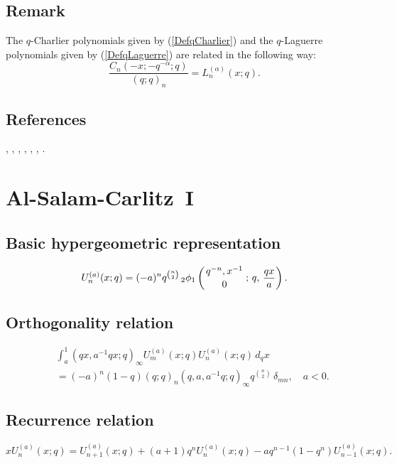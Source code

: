 \documentclass[envcountchap,graybox]{svmono}
\newcommand{\qhyp}[5]{\mbox{}_{#1}{\phi}_{#2}
\left(\genfrac{}{}{0pt}{}{#3}{#4}\,;\,q,\,#5\right)}
\newcommand{\qhyp}[5]{\,\mbox{}_{#1}\phi_{#2}\!\left(
  \genfrac{}{}{0pt}{}{#3}{#4};#5\right)}
\begin{document}
{{\subsection*{Remark}
The $q$-Charlier polynomials given by (\ref{DefqCharlier}) and the
$q$-Laguerre polynomials given by (\ref{DefqLaguerre}) are related in the
following way:
$$\frac{C_n(-x;-q^{-\alpha};q)}{(q;q)_n}=L_n^{(\alpha)}(x;q).$$

\subsection*{References}
\cite{AlvarezRonveaux}, \cite{AtakRahmanSuslov}, \cite{GasperRahman90},
\cite{Hahn}, \cite{Koelink96III}, \cite{Nikiforov+}, \cite{Zeng95}.


\section{Al-Salam-Carlitz~I}
\par\setcounter{equation}{0}

\subsection*{Basic hypergeometric representation}
\begin{equation}
\label{DefAlSalamCarlitzI}
U_n^{(a)}(x;q)=(-a)^nq^{\binom{n}{2}}\,\qhyp{2}{1}{q^{-n},x^{-1}}{0}{\frac{qx}{a}}.
\end{equation}

\subsection*{Orthogonality relation}
\begin{eqnarray}
\label{OrtAlSalamCarlitzI}
& &\int_a^1(qx,a^{-1}qx;q)_{\infty}U_m^{(a)}(x;q)U_n^{(a)}(x;q)\,d_qx\nonumber\\
& &{}=(-a)^n(1-q)(q;q)_n(q,a,a^{-1}q;q)_{\infty}q^{\binom{n}{2}}\,\delta_{mn},\quad a<0.
\end{eqnarray}

\subsection*{Recurrence relation}
\begin{equation}
\label{RecAlSalamCarlitzI}
xU_n^{(a)}(x;q)=U_{n+1}^{(a)}(x;q)+(a+1)q^nU_n^{(a)}(x;q)
-aq^{n-1}(1-q^n)U_{n-1}^{(a)}(x;q).
\end{equation}

}}
\end{document}

